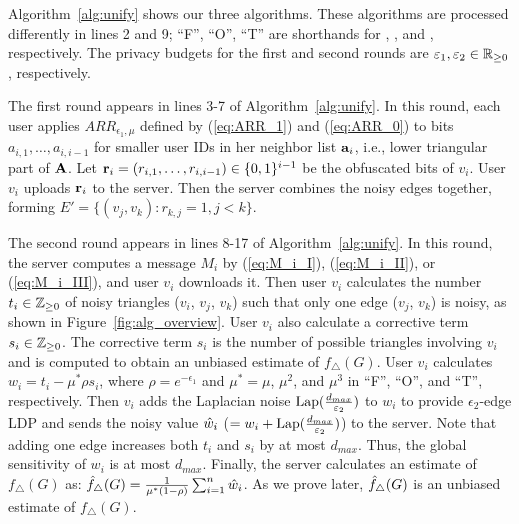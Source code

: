 Algorithm~\ref{alg:unify} shows our three algorithms.
These algorithms are processed differently in lines 2 and 9; ``F'', ``O'', ``T'' are shorthands for \AlgOne{}, \AlgTwo{}, and \AlgThree{}, respectively.
The privacy budgets for the first and second
rounds are $\varepsilon_1, \varepsilon_2 \in \mathbb{R}_{\ge0}$, respectively.

The first round appears in lines 3-7 of Algorithm~\ref{alg:unify}.
In this round, each user applies
$ARR_{\epsilon_1, \mu}$
defined by (\ref{eq:ARR_1}) and (\ref{eq:ARR_0}) to bits $a_{i,1}, \ldots, a_{i,i-1}$ for smaller user IDs in her neighbor list $\mathbf{a}_i$, i.e., lower triangular part of $\mathbf{A}$.
Let $\mathbf{r}_i = (r_{i,1}, \ldots, r_{i,i-1}) \in \{0,1\}^{i-1}$ be the obfuscated bits of $v_i$.
User $v_i$ uploads $\mathbf{r}_i$ to the server.
Then the server combines the noisy edges together, forming $E' = \{(v_j, v_k) : r_{k,j} = 1, j < k\}$.

The second round appears in lines 8-17 of Algorithm~\ref{alg:unify}.
In this round, the server computes a message $M_i$
by (\ref{eq:M_i_I}), (\ref{eq:M_i_II}), or (\ref{eq:M_i_III}),
and user $v_i$ downloads it.
Then user $v_i$ calculates the number $t_i \in \mathbb{Z}_{\ge0}$ of noisy triangles ($v_i$, $v_j$, $v_k$) such that
only one edge ($v_j$, $v_k$) is noisy, as shown in Figure~\ref{fig:alg_overview}.
User $v_i$ also calculate a corrective term $s_i \in \mathbb{Z}_{\ge0}$.
The corrective term $s_i$ is the number of
possible triangles involving $v_i$ 
and is computed to obtain an unbiased estimate of $f_\triangle(G)$.
User $v_i$ calculates $w_i = t_i - \mu^* \rho s_i$, where $\rho = e^{-\epsilon_1}$ and
$\mu^* = \mu$, $\mu^2$, and $\mu^3$
in ``F'', ``O'', and ``T'', respectively.
Then $v_i$ adds the Laplacian noise $\textrm{Lap}(\frac{d_{max}}{\varepsilon_2})$ to $w_i$ to provide $\epsilon_2$-edge LDP and sends the noisy value $\hat{w}_i$ ($= w_i + \textrm{Lap}(\frac{d_{max}}{\varepsilon_2})$) to the server. 
Note that adding one edge increases both $t_i$ and $s_i$ 
by at most $d_{max}$. 
Thus, the global sensitivity of $w_i$ is at most $d_{max}$. 
Finally, the server calculates an estimate of $f_\triangle(G)$ as: $\hat{f}_\triangle(G) = \frac{1}{\mu^*(1-\rho)}\sum_{i=1}^n \hat{w}_i$.
As we prove later, $\hat{f}_\triangle(G)$ is an unbiased estimate of $f_\triangle(G)$.

